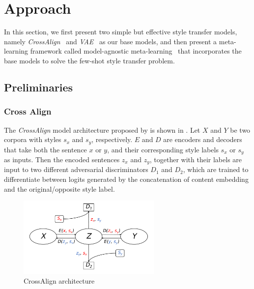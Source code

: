 \section{Approach}
\label{sec:approach}
In this section, we first present two simple but effective style transfer models, namely \emph{CrossAlign}~\cite{shen2017style} and \emph{VAE}~\cite{john2018disentangled} as our base models, and then present a meta-learning framework called model-agnostic meta-learning~\cite{finn2017model} that incorporates the base models to solve the few-shot style transfer problem.

\subsection{Preliminaries}
%
\subsubsection*{Cross Align}

The \emph{CrossAlign} model architecture proposed by \citet{shen2017style} is shown in . Let $X$ and $Y$ be two corpora with styles $s_x$ and $s_y$, respectively. $E$ and $D$ are encoders and decoders that take both the sentence $x$ or $y$, and their corresponding style labels $s_x$ or $s_y$ as inputs. Then the encoded sentences $z_x$ and $z_y$, together with their labels are input to two different adversarial discriminators $D_1$ and $D_2$, which are trained to differentiate between logits generated by the concatenation of content embedding and the original/opposite style label.

\begin{figure}[htbp]
	\centering
	\includegraphics[width=7cm]{./images/crossalign.pdf}
	\caption{CrossAlign architecture}
	\label{fig:crossalign}
\end{figure}

